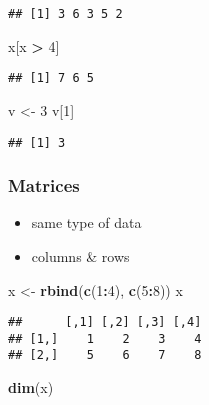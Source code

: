 \documentclass[
  a4paper,
]{article}
\newenvironment{Shaded}{\begin{snugshade}}{\end{snugshade}}
\newcommand{\DecValTok}[1]{\textcolor[rgb]{0.00,0.00,0.81}{#1}}
\newcommand{\FunctionTok}[1]{\textcolor[rgb]{0.13,0.29,0.53}{\textbf{#1}}}
\newcommand{\NormalTok}[1]{#1}
\newcommand{\OtherTok}[1]{\textcolor[rgb]{0.56,0.35,0.01}{#1}}
\newcommand{\SpecialCharTok}[1]{\textcolor[rgb]{0.81,0.36,0.00}{\textbf{#1}}}
\providecommand{\tightlist}{%
  \setlength{\itemsep}{0pt}\setlength{\parskip}{0pt}}
\begin{document}
\begin{verbatim}
## [1] 3 6 3 5 2
\end{verbatim}

\begin{Shaded}
\begin{Highlighting}[]
\NormalTok{x[x }\SpecialCharTok{\textgreater{}} \DecValTok{4}\NormalTok{]}
\end{Highlighting}
\end{Shaded}

\begin{verbatim}
## [1] 7 6 5
\end{verbatim}

\begin{Shaded}
\begin{Highlighting}[]
\NormalTok{v }\OtherTok{\textless{}{-}} \DecValTok{3}
\NormalTok{v[}\DecValTok{1}\NormalTok{]}
\end{Highlighting}
\end{Shaded}

\begin{verbatim}
## [1] 3
\end{verbatim}

\subsubsection{Matrices}\label{matrices}

\begin{itemize}
\tightlist
\item
  same type of data
\item
  columns \& rows
\end{itemize}

\begin{Shaded}
\begin{Highlighting}[]
\NormalTok{x }\OtherTok{\textless{}{-}} \FunctionTok{rbind}\NormalTok{(}\FunctionTok{c}\NormalTok{(}\DecValTok{1}\SpecialCharTok{:}\DecValTok{4}\NormalTok{), }\FunctionTok{c}\NormalTok{(}\DecValTok{5}\SpecialCharTok{:}\DecValTok{8}\NormalTok{))}
\NormalTok{x}
\end{Highlighting}
\end{Shaded}

\begin{verbatim}
##      [,1] [,2] [,3] [,4]
## [1,]    1    2    3    4
## [2,]    5    6    7    8
\end{verbatim}

\begin{Shaded}
\begin{Highlighting}[]
\FunctionTok{dim}\NormalTok{(x)}
\end{Highlighting}
\end{Shaded}
\end{document}
